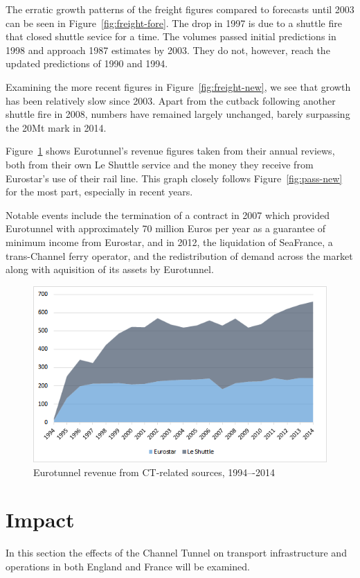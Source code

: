 \documentclass[12pt]{article} %
\begin{document}
The erratic growth patterns of the freight figures compared to forecasts until 2003 can be seen in Figure~\ref{fig:freight-fore}. The drop in 1997 is due to a shuttle fire that closed shuttle sevice for a time. The volumes passed initial predictions in 1998 and approach 1987 estimates by 2003. They do not, however, reach the updated predictions of 1990 and 1994.

Examining the more recent figures in Figure~\ref{fig:freight-new}, we see that growth has been relatively slow since 2003. Apart from the cutback following another shuttle fire in 2008, numbers have remained largely unchanged, barely surpassing the 20Mt mark in 2014.

Figure~\ref{fig:revenue} shows Eurotunnel's revenue figures taken from their annual reviews\cite{et-reports}, both from their own Le Shuttle service and the money they receive from Eurostar's use of their rail line. This graph closely follows Figure~\ref{fig:pass-new} for the most part, especially in recent years. 

Notable events include the termination of a contract in 2007 which provided Eurotunnel with approximately 70 million Euros per year as a guarantee of minimum income from Eurostar, and in 2012, the liquidation of SeaFrance, a trans-Channel ferry operator, and the redistribution of demand across the market along with aquisition of its assets by Eurotunnel.\cite{et-reports}

\begin{figure}[htp]
  \centering
  \includegraphics[width=\textwidth]{revenue}
  \caption{Eurotunnel revenue from CT-related sources, 1994–-2014}
  \label{fig:revenue}
\end{figure}

\section{Impact}
In this section the effects of the Channel Tunnel on transport infrastructure and operations in both England and France will be examined.
\end{document}
